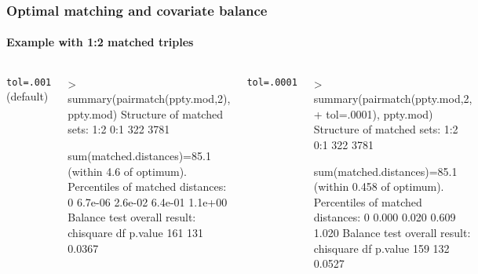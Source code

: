 
\begin{frame}[fragile] \frametitle{Optimal matching and covariate balance}

\framesubtitle{Example with 1:2 matched triples}

\begin{columns}
{
  \begin{center}
    { \texttt{tol=.001} (default)}
  \end{center}
{\footnotesize
\begin{semiverbatim}
> summary(pairmatch(ppty.mod,2),
ppty.mod)
Structure of matched sets:
 1:2  0:1
 322 3781

sum(matched.distances)=85.1
(within 4.6 of optimum).
Percentiles of matched distances:
     0%
6.7e-06 2.6e-02 6.4e-01 1.1e+00
Balance test overall result:
  chisquare  df p.value
        161 131  0.0367
\end{semiverbatim}
}
}
{
  \begin{center}
    { \texttt{tol=.0001}}
  \end{center}
{\footnotesize
\begin{semiverbatim}
> summary(pairmatch(ppty.mod,2,
+ tol=.0001), ppty.mod)
Structure of matched sets:
 1:2  0:1
 322 3781

sum(matched.distances)=85.1
(within 0.458 of optimum).
Percentiles of matched distances:
   0%
0.000 0.020 0.609 1.020
Balance test overall result:
  chisquare  df p.value
        159 132  0.0527
\end{semiverbatim}
}
}
\end{columns}


\end{frame}




\begin{frame}[allowframebreaks]



{\scriptsize

}
\end{frame}


